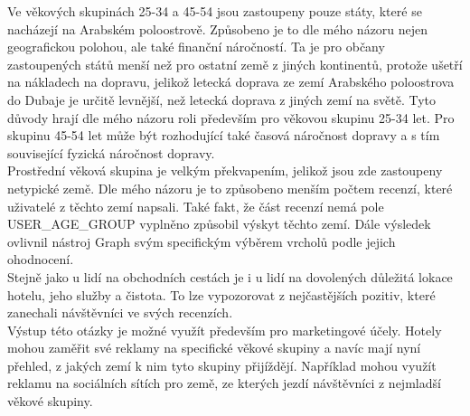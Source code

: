 \documentclass[czech,BP]{thesiskiv}
\begin{document}
Ve věkových skupinách 25-34 a 45-54 jsou zastoupeny pouze státy, které se nacházejí na Arabském poloostrově. Způsobeno je to dle mého názoru nejen geografickou polohou, ale také finanční náročností. Ta je pro občany zastoupených států menší než pro ostatní země z jiných kontinentů, protože ušetří na nákladech na dopravu, jelikož letecká doprava ze zemí Arabského poloostrova do Dubaje je určitě levnější, než letecká doprava z jiných zemí na světě. Tyto důvody hrají dle mého názoru roli především pro věkovou skupinu 25-34 let. Pro skupinu 45-54 let může být rozhodující také časová náročnost dopravy a s tím související fyzická náročnost dopravy.
\\
Prostřední věková skupina je velkým překvapením, jelikož jsou zde zastoupeny netypické země. Dle mého názoru je to způsobeno menším počtem recenzí, které uživatelé z těchto zemí napsali. Také fakt, že část recenzí nemá pole USER\_AGE\_GROUP vyplněno způsobil výskyt těchto zemí. Dále výsledek ovlivnil nástroj Graph svým specifickým výběrem vrcholů podle jejich ohodnocení. 
\\
Stejně jako u lidí na obchodních cestách je i u lidí na dovolených důležitá lokace hotelu, jeho služby a čistota. To lze vypozorovat z nejčastějších pozitiv, které zanechali návštěvníci ve svých recenzích.
\\
Výstup této otázky je možné využít především pro marketingové účely. Hotely mohou zaměřit své reklamy na specifické věkové skupiny a navíc mají nyní přehled, z jakých zemí k nim tyto skupiny přijíždějí. Například mohou využít reklamu na sociálních sítích pro země, ze kterých jezdí návštěvníci z nejmladší věkové skupiny.
\end{document}
